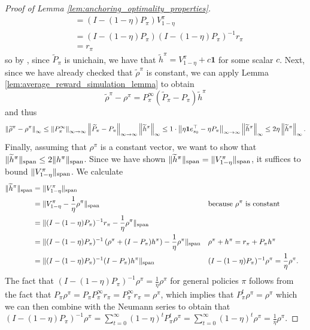 \documentclass{article}
\theoremstyle{plain}
\theoremstyle{plain}
\theoremstyle{remark}
\theoremstyle{plain}
\theoremstyle{plain}
\newcommand{\one}{\mathbf{1}}
\newcommand{\htilde}{\widetilde{h}}
\newcommand{\rhot}{\widetilde{\rho}}
\begin{document}
\begin{proof}[Proof of Lemma \ref{lem:anchoring_optimality_properties}]
\begin{align*}
        &= (I - (1-\eta)P_\pi) V_{1-\eta}^\pi \\
        &= (I - (1-\eta)P_\pi) (I - (1-\eta)P_\pi)^{-1} r_\pi \\
        &= r_\pi
    \end{align*}
    so by \cite[Corollary 8.2.7]{puterman_markov_1994}, since $\widetilde{P}_\pi$ is unichain, we have that $\widetilde{h}^\pi = V_{1-\eta}^\pi + c \one$ for some scalar $c$. Next, since we have already checked that $\rhot^\pi$ is constant, we can apply Lemma \ref{lem:average_reward_simulation_lemma} to obtain
    \[
        \rhot^\pi - \rho^\pi = P_\pi^\infty (\widetilde{P}_\pi - P_\pi) \htilde^\pi
    \]
    and thus
    \[
    \infnorm{\rhot^\pi - \rho^\pi} \leq \infinfnorm{P_\pi^\infty} \infinfnorm{\widetilde{P}_\pi - P_\pi} \infnorm{\htilde^\pi} \leq 1 \cdot \infinfnorm{\eta \one e_{s_0}^\top -\eta P_\pi } \infnorm{\htilde^\pi} \leq 2\eta \infnorm{\htilde^\pi}.
    \]
    Finally, assuming that $\rho^\pi$ is a constant vector, we want to show that $\spannorm{\htilde^\pi} \leq 2\spannorm{h^\pi}$. Since we have shown
    $\spannorm{\htilde^\pi}  = \spannorm{V^\pi_{1-\eta}}$, it suffices to bound $\Vert V^\pi_{1-\eta}\Vert _{\textnormal{span}}$. We calculate
    \begin{align*}
         \spannorm{\htilde^\pi} &=  \spannorm{V^\pi_{1-\eta}} \\
         &= \spannorm{V^\pi_{1-\eta} - \frac{1}{\eta} \rho^\pi} && \text{because $\rho^\pi$ is constant} \\
         &= \spannorm{(I - (1-\eta) P_{\pi})^{-1} r_\pi - \frac{1}{\eta} \rho^\pi} \\
         &= \spannorm{(I - (1-\eta) P_{\pi})^{-1} \left(\rho^\pi + (I - P_\pi)h^\pi \right) - \frac{1}{\eta} \rho^\pi} && \text{$\rho^\pi + h^\pi = r_\pi +  P_\pi h^\pi$}\\
         &= \spannorm{(I - (1-\eta) P_{\pi})^{-1}(I - P_\pi)h^\pi} && \text{$(I - (1-\eta) P_{\pi})^{-1} \rho^\pi = \frac{1}{\eta}\rho^\pi$}.
    \end{align*}
    The fact that $(I - (1-\eta) P_{\pi})^{-1} \rho^\pi = \frac{1}{\eta}\rho^\pi$ for general policies $\pi$ follows from the fact that $P_{\pi} \rho^\pi = P_{\pi} P_\pi^{\infty } r_\pi = P_\pi^{\infty } r_\pi = \rho^\pi$, which implies that $P_\pi^t \rho^\pi = \rho^\pi$ which we can then combine with the Neumann series to obtain that
    $(I - (1-\eta) P_{\pi})^{-1} \rho^\pi = \sum_{t=0}^\infty (1-\eta)^t P_\pi^t \rho^\pi = \sum_{t=0}^\infty (1-\eta)^t \rho^\pi = \frac{1}{\eta}\rho^\pi$.
    

\end{proof}
\end{document}
